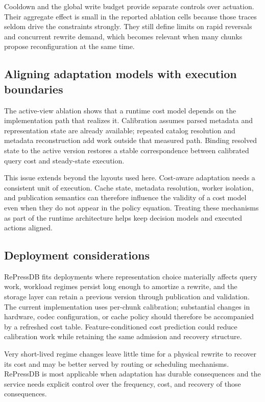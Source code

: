 \documentclass[final,5p,times,twocolumn,authoryear]{elsarticle}
\begin{document}
Cooldown and the global write budget provide separate controls over actuation. Their aggregate effect is small in the reported ablation cells because those traces seldom drive the constraints strongly. They still define limits on rapid reversals and concurrent rewrite demand, which becomes relevant when many chunks propose reconfiguration at the same time.

\subsection{Aligning adaptation models with execution boundaries}

The active-view ablation shows that a runtime cost model depends on the implementation path that realizes it. Calibration assumes parsed metadata and representation state are already available; repeated catalog resolution and metadata reconstruction add work outside that measured path. Binding resolved state to the active version restores a stable correspondence between calibrated query cost and steady-state execution.

This issue extends beyond the layouts used here. Cost-aware adaptation needs a consistent unit of execution. Cache state, metadata resolution, worker isolation, and publication semantics can therefore influence the validity of a cost model even when they do not appear in the policy equation. Treating these mechanisms as part of the runtime architecture helps keep decision models and executed actions aligned.

\subsection{Deployment considerations}

RePressDB fits deployments where representation choice materially affects query work, workload regimes persist long enough to amortize a rewrite, and the storage layer can retain a previous version through publication and validation. The current implementation uses per-chunk calibration; substantial changes in hardware, codec configuration, or cache policy should therefore be accompanied by a refreshed cost table. Feature-conditioned cost prediction could reduce calibration work while retaining the same admission and recovery structure.

Very short-lived regime changes leave little time for a physical rewrite to recover its cost and may be better served by routing or scheduling mechanisms. RePressDB is most applicable when adaptation has durable consequences and the service needs explicit control over the frequency, cost, and recovery of those consequences.
\end{document}
